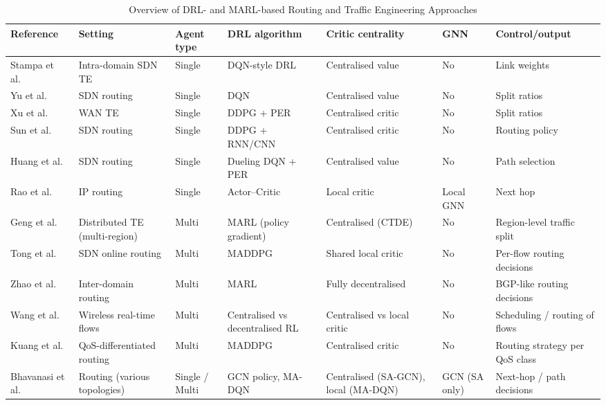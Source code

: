 \documentclass[10pt,journal,comsoc]{IEEEtran}
\begin{document}
\begin{table}[htbp]
  \centering
  \caption{Overview of DRL- and MARL-based Routing and Traffic Engineering Approaches}
  \label{tab:soa_overview}
  \begin{tabular}{|p{2.2cm}|p{2.1cm}|p{1.4cm}|p{1.9cm}|p{1.9cm}|p{1.5cm}|p{2.1cm}|}
    \hline
    \textbf{Reference} & \textbf{Setting} & \textbf{Agent type} & \textbf{DRL algorithm} & \textbf{Critic centrality} & \textbf{GNN} & \textbf{Control/output} \\
    \hline
    Stampa et al.~\cite{stampa2017deep} & Intra-domain SDN TE & Single & DQN-style DRL & Centralised value & No & Link weights \\
    \hline
    Yu et al.~\cite{yu2018drom} & SDN routing & Single & DQN & Centralised value & No & Split ratios \\
    \hline
    Xu et al.~\cite{xu2018experience} & WAN TE & Single & DDPG + PER & Centralised critic & No & Split ratios \\
    \hline
    Sun et al.~\cite{8780950} & SDN routing & Single & DDPG + RNN/CNN & Centralised critic & No & Routing policy \\
    \hline
    Huang et al.~\cite{huang2024intelligent} & SDN routing & Single & Dueling DQN + PER & Centralised value & No & Path selection \\
    \hline
    Rao et al.~\cite{rao2024dar} & IP routing & Single & Actor--Critic & Local critic & Local GNN & Next hop \\
    \hline
    Geng et al.~\cite{geng2020multi} & Distributed TE (multi-region) & Multi & MARL (policy gradient) & Centralised (CTDE) & No & Region-level traffic split \\
    \hline
    Tong et al.~\cite{tong2023intelligent} & SDN online routing & Multi & MADDPG & Shared local critic & No & Per-flow routing decisions \\
    \hline
    Zhao et al.~\cite{zhao2020improving} & Inter-domain routing & Multi & MARL & Fully decentralised & No & BGP-like routing decisions \\
    \hline
    Wang et al.~\cite{wang2024scheduling} & Wireless real-time flows & Multi & Centralised vs decentralised RL & Centralised vs local critic & No & Scheduling / routing of flows \\
    \hline
    Kuang et al.~\cite{kuang2025rs} & QoS-differentiated routing & Multi & MADDPG & Centralised critic & No & Routing strategy per QoS class \\
    \hline
    Bhavanasi et al.~\cite{bhavanasi2022routing} & Routing (various topologies) & Single / Multi & GCN policy, MA-DQN & Centralised (SA-GCN), local (MA-DQN) & GCN (SA only) & Next-hop / path decisions \\

\end{tabular}
\end{table}
\end{document}
